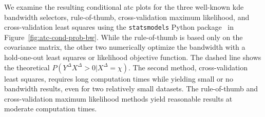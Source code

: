 \documentclass[pdflatex]{sn-jnl}
\theoremstyle{plain}%
\theoremstyle{definition}
\newcommand{\diffxrv}{X^{\Delta}}
\newcommand{\diffyrv}{Y^{\Delta}}
\newcommand{\xcond}{\chi}
\begin{document}
We examine the resulting conditional \ac{atc} plots for the three well-known \ac{kde} bandwidth selectors, rule-of-thumb, cross-validation maximum likelihood, and cross-validation least squares using the \verb|statsmodels| Python package~\citep{Seabold2010} in Figure~\ref{fig:atc-cond-prob-bw}.
While the rule-of-thumb is based only on the covariance matrix, the other two numerically optimize the bandwidth with a hold-one-out least squares or likelihood objective function.
The dashed line shows the theoretical $P(\diffyrv \diffxrv > 0 | \diffxrv = \xcond)$.
The second method, cross-validation least squares, requires long computation times while yielding small or no bandwidth results, even for two relatively small datasets.
The rule-of-thumb and cross-validation maximum likelihood methods yield reasonable results at moderate computation times.
\end{document}
